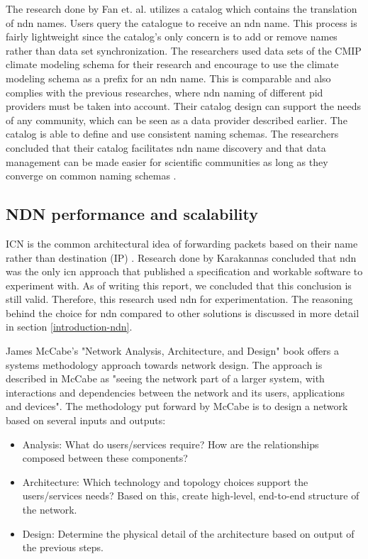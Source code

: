 The research done by Fan et. al. utilizes a catalog which contains the translation of \gls{ndn} names. Users query the catalogue to receive an \gls{ndn} name. This process is fairly lightweight since the catalog's only concern is to add or remove names rather than data set synchronization. The researchers used data sets of the CMIP climate modeling schema for their research and encourage to use the climate modeling schema as a prefix for an \gls{ndn} name. This is comparable and also complies with the previous researches, where \gls{ndn} naming of different \gls{pid} providers must be taken into account.
Their catalog design can support the needs of any community, which can be seen as a data provider described earlier. The catalog is able to define and use consistent naming schemas.
The researchers concluded that their catalog facilitates \gls{ndn} name discovery and that data management can be made easier for scientific communities as long as they converge on common naming schemas \cite{ndn-man}. 

\subsection{NDN performance and scalability}
\label{introduction-related-work-ndn}
ICN is the common architectural idea of forwarding packets based on their name rather than destination (IP) \cite{jacobson2009networking}. Research done by Karakannas \cite{icn-bd} concluded that \gls{ndn} was the only \gls{icn} approach that published a specification and workable software to experiment with. As of writing this report, we concluded that this conclusion is still valid. Therefore, this research used \gls{ndn} for experimentation. The reasoning behind the choice for \gls{ndn} compared to other solutions is discussed in more detail in section \ref{introduction-ndn}.

James McCabe's "Network Analysis, Architecture, and Design" \cite{mccabe2010network} book offers a systems methodology approach towards network design. The approach is described in McCabe as "seeing the network part of a larger system, with interactions and dependencies between the network and its users, applications and devices". The methodology put forward by McCabe is to design a network based on several inputs and outputs:
\begin{itemize}
    \item Analysis: What do users/services require? How are the relationships composed between these components?
    \item Architecture: Which technology and topology choices support the users/services needs? Based on this, create high-level, end-to-end structure of the network.
    \item Design: Determine the physical detail of the architecture based on output of the previous steps.
\end{itemize}

